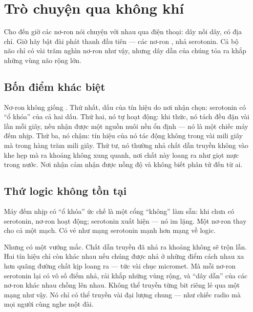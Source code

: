 \chapter{Trò chuyện qua không khí}


Cho đến giờ các nơ-ron nói chuyện với nhau qua điện thoại: dây nối dây, có địa chỉ. Giờ hãy bật đài phát thanh đầu tiên --- các nơ-ron , nhả serotonin. Cả bộ não chỉ có vài trăm nghìn nơ-ron như vậy, nhưng dây dẫn của chúng tỏa ra khắp những vùng não rộng lớn.

\section*{Bốn điểm khác biệt}

Nơ-ron  không giống . Thứ nhất, dấu của tín hiệu do nơi nhận chọn: serotonin có ``ổ khóa'' của cả hai dấu. Thứ hai, nó tự hoạt động: khi thức, nó tách đều đặn vài lần mỗi giây, nếu nhận được một nguồn nuôi nền ổn định --- nó là một chiếc máy đếm nhịp. Thứ ba, nó chậm: tín hiệu của nó tác động không trong vài mili giây mà trong hàng trăm mili giây. Thứ tư, nó thường nhả chất dẫn truyền không vào khe hẹp mà ra khoảng không xung quanh, nơi chất này loang ra như giọt mực trong nước. Nơi nhận cảm nhận được nồng độ và không biết phân tử đến từ ai.

\section*{Thứ logic không tồn tại}

Máy đếm nhịp có ``ổ khóa'' ức chế là một cổng ``không'' làm sẵn: khi chưa có serotonin, nơ-ron hoạt động; serotonin xuất hiện --- nó im lặng. Một nơ-ron thay cho cả một mạch. Có vẻ như mạng serotonin mạnh hơn mạng  về logic.

Nhưng có một vướng mắc. Chất dẫn truyền đã nhả ra khoảng không sẽ trộn lẫn. Hai tín hiệu chỉ còn khác nhau nếu chúng được nhả ở những điểm cách nhau xa hơn quãng đường chất kịp loang ra --- tức vài chục micromet. Mà mỗi nơ-ron serotonin lại có vô số điểm nhả, rải khắp những vùng rộng, và ``dây dẫn'' của các nơ-ron khác nhau chồng lên nhau. Không thể truyền từng bit riêng lẻ qua một mạng như vậy. Nó chỉ có thể truyền vài đại lượng chung --- như chiếc radio mà mọi người cùng nghe một đài.

